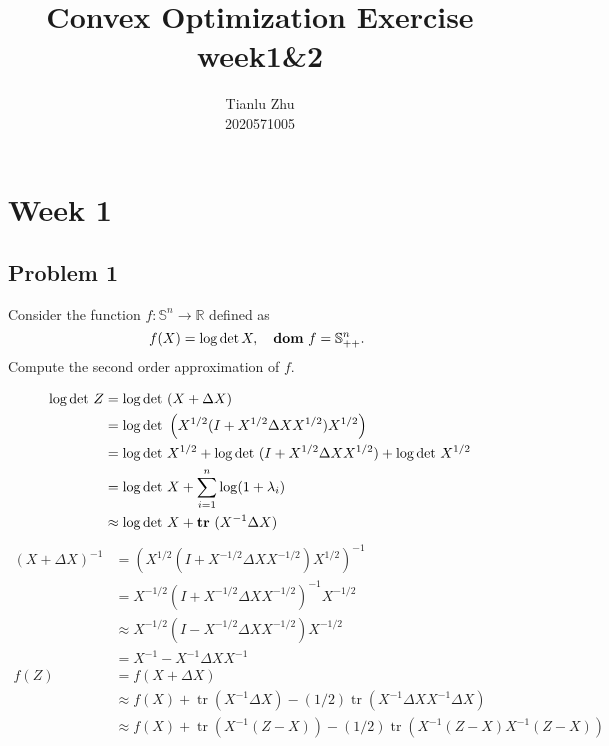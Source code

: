 \documentclass[en,hazy,black,12pt,device = normal]{elegantnote}
\title{Convex Optimization Exercise week1\&2}
\author{Tianlu Zhu \\ 2020571005}
\date{}
\begin{document}
\maketitle

\section*{Week 1}
\subsection*{Problem 1}
Consider the function $f: \mathbb{S}^n \rightarrow \mathbb{R}$ defined as
$$
f(X)=\log \operatorname{det} X, \quad  {\textbf{dom}\ } f=\mathbb{S}_{++}^n \text {. }
$$
Compute the second order approximation of $f$.

\begin{tcolorbox}
    \sol

    \begin{align*}
        \log {\operatorname{det}\ } Z &= \log {\operatorname{det}\ } (X+ \Delta X) \\
        &= \log {\operatorname{det}\ } \left(X^{1/2} (I + X^{1/2} \Delta X X^{1/2} )X^{1/2}\right)\\
        &= \log {\operatorname{det}\ } X^{1/2} + \log {\operatorname{det}\ } (I + X^{1/2} \Delta X X^{1/2} ) + \log {\operatorname{det}\ } X^{1/2} \\
        &= \log{\operatorname{det}\ } X + \sum_{i=1}^{n}\log (1+ \lambda _i)\\
        &\approx \log{\operatorname{det}\ } X + {\textbf{tr}\ }(X^{-1}\Delta X)
    \end{align*}
    \begin{align*}
        (X+\Delta X)^{-1} & =\left(X^{1 / 2}\left(I+X^{-1 / 2} \Delta X X^{-1 / 2}\right) X^{1 / 2}\right)^{-1} \\
        & =X^{-1 / 2}\left(I+X^{-1 / 2} \Delta X X^{-1 / 2}\right)^{-1} X^{-1 / 2} \\
        & \approx X^{-1 / 2}\left(I-X^{-1 / 2} \Delta X X^{-1 / 2}\right) X^{-1 / 2} \\
        & =X^{-1}-X^{-1} \Delta X X^{-1}\\
            f(Z) & =f(X+\Delta X) \\
            & \approx f(X)+\operatorname{tr}\left(X^{-1} \Delta X\right)-(1 / 2) \operatorname{tr}\left(X^{-1} \Delta X X^{-1} \Delta X\right) \\
            & \approx f(X)+\operatorname{tr}\left(X^{-1}(Z-X)\right)-(1 / 2) \operatorname{tr}\left(X^{-1}(Z-X) X^{-1}(Z-X)\right)
    \end{align*}
\end{tcolorbox}
\end{document}
